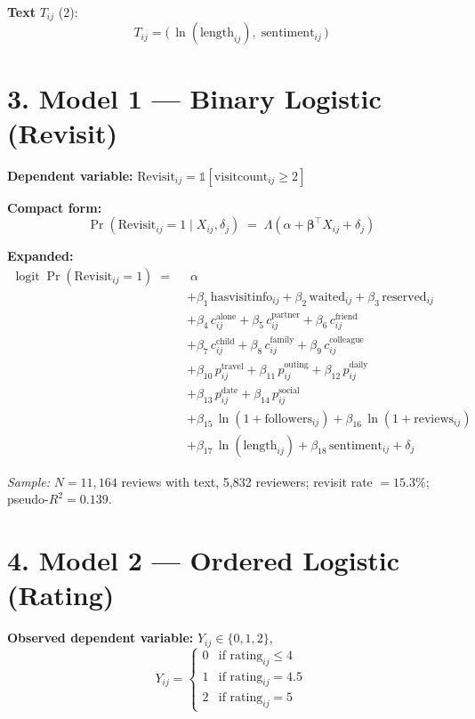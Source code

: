 \documentclass[11pt,a4paper]{article}
\newcommand{\logit}{\operatorname{logit}}
\newcommand{\prob}{\operatorname{Pr}}
\begin{document}
\textbf{Text} $T_{ij}$ (2):
\[
T_{ij} = \bigl(\,\ln(\text{length}_{ij}),\; \text{sentiment}_{ij}\,\bigr)
\]

\hrulefill

\section*{3. Model 1 — Binary Logistic (Revisit)}

\textbf{Dependent variable:} $\text{Revisit}_{ij} = \mathbb{1}[\text{visitcount}_{ij} \geq 2]$

\textbf{Compact form:}
\[
\prob(\text{Revisit}_{ij} = 1 \mid X_{ij}, \delta_j)
    \;=\; \Lambda\!\left(\alpha + \bm{\beta}^{\top} X_{ij} + \delta_j\right)
\]

\textbf{Expanded:}
\begin{align*}
\logit \prob(\text{Revisit}_{ij} = 1) \;=\; &\; \alpha \\
   &+ \beta_{1}\,\text{hasvisitinfo}_{ij}
    + \beta_{2}\,\text{waited}_{ij}
    + \beta_{3}\,\text{reserved}_{ij} \\
   &+ \beta_{4}\,c^{\mathrm{alone}}_{ij}
    + \beta_{5}\,c^{\mathrm{partner}}_{ij}
    + \beta_{6}\,c^{\mathrm{friend}}_{ij} \\
   &+ \beta_{7}\,c^{\mathrm{child}}_{ij}
    + \beta_{8}\,c^{\mathrm{family}}_{ij}
    + \beta_{9}\,c^{\mathrm{colleague}}_{ij} \\
   &+ \beta_{10}\,p^{\mathrm{travel}}_{ij}
    + \beta_{11}\,p^{\mathrm{outing}}_{ij}
    + \beta_{12}\,p^{\mathrm{daily}}_{ij} \\
   &+ \beta_{13}\,p^{\mathrm{date}}_{ij}
    + \beta_{14}\,p^{\mathrm{social}}_{ij} \\
   &+ \beta_{15}\,\ln(1 + \text{followers}_{ij})
    + \beta_{16}\,\ln(1 + \text{reviews}_{ij}) \\
   &+ \beta_{17}\,\ln(\text{length}_{ij})
    + \beta_{18}\,\text{sentiment}_{ij}
    + \delta_j
\end{align*}

\textit{Sample:} $N = 11{,}164$ reviews with text, 5{,}832 reviewers;
revisit rate $= 15.3\%$; pseudo-$R^2 = 0.139$.

\hrulefill

\section*{4. Model 2 — Ordered Logistic (Rating)}

\textbf{Observed dependent variable:} $Y_{ij} \in \{0, 1, 2\}$,
\[
Y_{ij} =
\begin{cases}
0 & \text{if rating}_{ij} \leq 4 \\
1 & \text{if rating}_{ij} = 4.5 \\
2 & \text{if rating}_{ij} = 5
\end{cases}
\]
\end{document}

